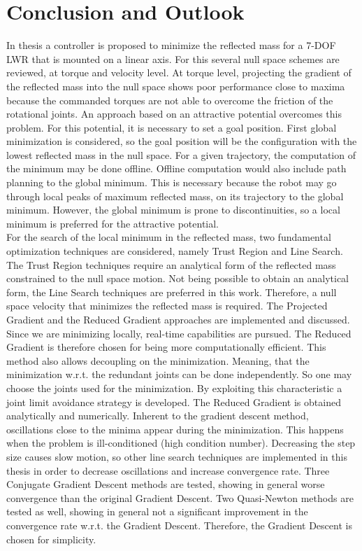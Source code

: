 \chapter{Conclusion and Outlook}
\label{ch:conclusion}


In thesis a controller is proposed to minimize the reflected mass for a 7-DOF LWR that is mounted on a linear axis. For this several null space schemes are reviewed, at torque and velocity level. At torque level, projecting the gradient of the reflected mass into the null space shows poor performance close to maxima because the commanded torques are not able to overcome the friction of the rotational joints. An approach based on an attractive potential  overcomes this problem. For this potential, it is necessary to set a goal position. First global minimization is considered, so the goal position will be the configuration with the lowest reflected mass in the null space.  For a given trajectory, the computation of the minimum may be done offline. Offline computation would also include path planning to the global minimum. This is necessary because the robot may go through local peaks of maximum reflected mass, on its trajectory to the global minimum. However, the global minimum is prone to discontinuities, so a local minimum is preferred for the attractive potential. \\
For the search of the local minimum in the reflected mass, two fundamental optimization techniques are considered, namely Trust Region and Line Search. The Trust Region techniques require an analytical form of the reflected mass constrained to the null space motion. Not being possible to obtain an analytical form, the Line Search techniques are preferred in this work. Therefore, a null space velocity that minimizes the reflected mass is required. The Projected Gradient and the Reduced Gradient approaches are implemented and discussed. Since we are minimizing locally, real-time capabilities are pursued. The Reduced Gradient is therefore chosen for being more computationally efficient. This method also allows decoupling on the minimization. Meaning, that the minimization w.r.t. the redundant joints can be done independently. So one may choose the joints used for the minimization. By exploiting this characteristic a joint limit avoidance strategy is developed.  The Reduced Gradient is obtained analytically and numerically. Inherent to the gradient descent method, oscillations close to the minima appear during the minimization. This happens when the problem is ill-conditioned (high condition number). Decreasing the step size causes slow motion, so other line search techniques are implemented in this thesis in order to decrease oscillations and increase convergence rate. Three Conjugate Gradient Descent methods are tested, showing in general worse convergence than the original Gradient Descent. Two Quasi-Newton methods are tested as well, showing in general not a significant improvement in the convergence rate w.r.t. the Gradient Descent. Therefore, the Gradient Descent is chosen for simplicity. %
